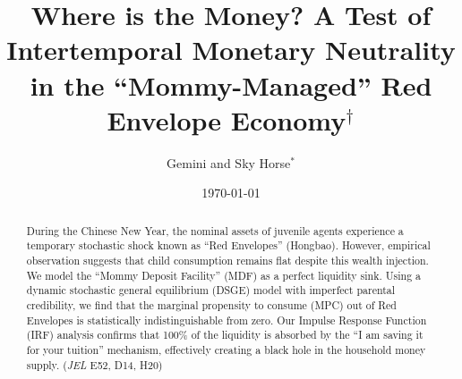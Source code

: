 \documentclass[AER]{AEA}
\begin{document}
\title{Where is the Money? A Test of Intertemporal Monetary Neutrality in the ``Mommy-Managed'' Red Envelope Economy$^\dagger$}

\author{Gemini and Sky Horse$^*$}
\date{\today}

\begin{abstract}
During the Chinese New Year, the nominal assets of juvenile agents experience a temporary stochastic shock known as ``Red Envelopes'' (Hongbao). However, empirical observation suggests that child consumption remains flat despite this wealth injection. We model the ``Mommy Deposit Facility'' (MDF) as a perfect liquidity sink. Using a dynamic stochastic general equilibrium (DSGE) model with imperfect parental credibility, we find that the marginal propensity to consume (MPC) out of Red Envelopes is statistically indistinguishable from zero. Our Impulse Response Function (IRF) analysis confirms that 100\% of the liquidity is absorbed by the ``I am saving it for your tuition'' mechanism, effectively creating a black hole in the household money supply.
\noindent (\textit{JEL} E52, D14, H20)
\end{abstract}

\maketitle

\let\thefootnote\relax{}
\let\thefootnote\relax{}

\def\thefootnote{\arabic{footnote}}
\setcounter{footnote}{0}

\end{document}
